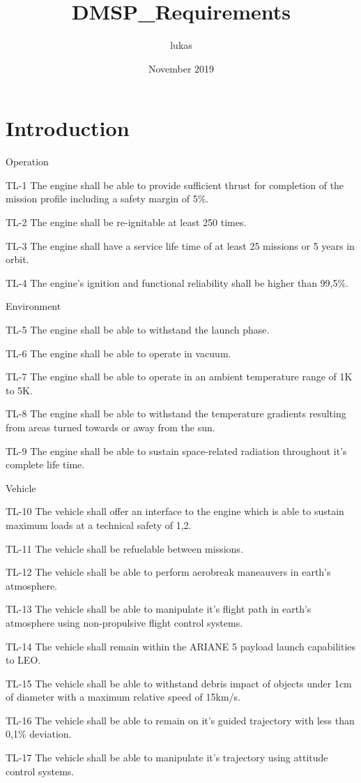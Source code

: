 \documentclass{article}
\title{DMSP_Requirements}
\author{lukas }
\date{November 2019}
\begin{document}
\section{Introduction}

Operation

TL-1 The engine shall be able to provide sufficient thrust for completion of the mission profile including a safety margin of 5\%.

TL-2 The engine shall be re-ignitable at least 250 times.

TL-3 The engine shall have a service life time of at least 25 missions or 5 years in orbit.

TL-4 The engine's ignition and functional reliability shall be higher than 99,5\%.

Environment

TL-5 The engine shall be able to withstand the launch phase.

TL-6 The engine shall be able to operate in vacuum.

TL-7 The engine shall be able to operate in an ambient temperature range of 1K to 5K.

TL-8 The engine shall be able to withstand the temperature gradients resulting from areas turned towards or away from the sun.

TL-9 The engine shall be able to sustain space-related radiation throughout it's complete life time.

Vehicle

TL-10 The vehicle shall offer an interface to the engine which is able to sustain maximum loads at a technical safety of 1,2.

TL-11 The vehicle shall be refuelable between missions.

TL-12 The vehicle shall be able to perform aerobreak maneauvers in earth's atmosphere.

TL-13 The vehicle shall be able to manipulate it's flight path in earth's atmosphere using non-propulsive flight control systems.

TL-14 The vehicle shall remain within the ARIANE 5 payload launch capabilities to LEO.

TL-15 The vehicle shall be able to withstand debris impact of objects under 1cm of diameter with a maximum relative speed of 15km/s.

TL-16 The vehicle shall be able to remain on it's guided trajectory with less than 0,1\% deviation.

TL-17 The vehicle shall be able to manipulate it's trajectory using attitude control systems.
\end{document}
